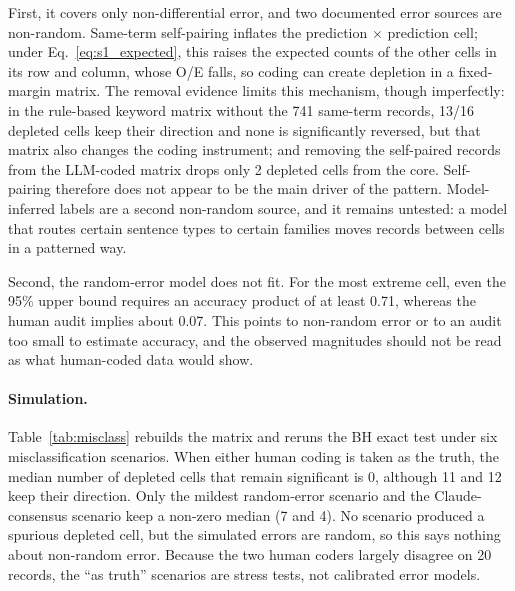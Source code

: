 First, it covers only non-differential error, and two documented error sources are non-random. Same-term self-pairing inflates the prediction $\times$ prediction cell; under Eq.~\eqref{eq:s1_expected}, this raises the expected counts of the other cells in its row and column, whose O/E falls, so coding can create depletion in a fixed-margin matrix. The removal evidence limits this mechanism, though imperfectly: in the rule-based keyword matrix without the 741 same-term records, 13/16 depleted cells keep their direction and none is significantly reversed, but that matrix also changes the coding instrument; and removing the self-paired records from the LLM-coded matrix drops only 2 depleted cells from the core. Self-pairing therefore does not appear to be the main driver of the pattern. Model-inferred labels are a second non-random source, and it remains untested: a model that routes certain sentence types to certain families moves records between cells in a patterned way.

Second, the random-error model does not fit. For the most extreme cell, even the 95\% upper bound requires an accuracy product of at least 0.71, whereas the human audit implies about 0.07. This points to non-random error or to an audit too small to estimate accuracy, and the observed magnitudes should not be read as what human-coded data would show.

\paragraph{Simulation.} Table~\ref{tab:misclass} rebuilds the matrix and reruns the BH exact test under six misclassification scenarios. When either human coding is taken as the truth, the median number of depleted cells that remain significant is 0, although 11 and 12 keep their direction. Only the mildest random-error scenario and the Claude-consensus scenario keep a non-zero median (7 and 4). No scenario produced a spurious depleted cell, but the simulated errors are random, so this says nothing about non-random error. Because the two human coders largely disagree on 20 records, the ``as truth'' scenarios are stress tests, not calibrated error models.

